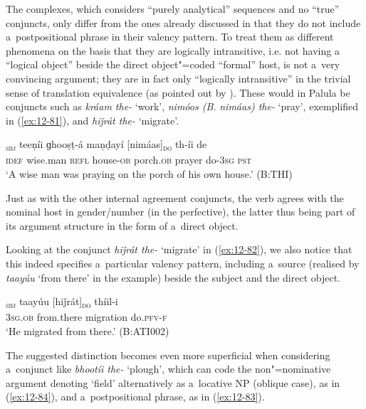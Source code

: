 The complexes, which \citet[201]{verma1993} considers ``purely analytical'' sequences and no ``true'' conjuncts, only differ from the ones already discussed in that they do not include a~postpositional phrase in their valency pattern. To treat them as different phenomena on the basis that they are logically intransitive, i.e. not having a ``logical object'' beside the direct object"=coded ``formal'' host, is not a~very convincing argument; they are in fact only ``logically intransitive'' in the trivial sense of translation equivalence (as pointed out by \citealt[157]{masica1993}). These would in Palula be conjuncts such as \textit{kráam the-} `work', \textit{nimóos (B.} \textit{nimáas) the-} `pray', exemplified in (\ref{ex:12-81}), and \textit{hiǰrát the-} `migrate'. 

\begin{exe}
\ex
\label{ex:12-81}
\gll [ak buzrúɡ]\textsubscript{\textsc{sbj}} teeṇíi ɡhooṣṭ-á maṇḍayí [nimáas]\textsubscript{\textsc{do}} th-íi de \\
\textsc{idef} wise.man \textsc{refl} house-\textsc{ob} porch.\textsc{ob}  prayer do-\textsc{3sg} \textsc{pst} \\
\glt `A wise man was praying on the porch of his own house.' (B:THI)
\end{exe}

Just as with the other internal agreement conjuncts, the verb agrees with the nominal host in gender/number (in the perfective), the latter thus being part of its argument structure in the form of a~direct object. 


Looking at the conjunct \textit{hiǰrát the-} `migrate' in (\ref{ex:12-82}), we also notice that this indeed specifies a~particular valency pattern, including a~source (realised by \textit{taayúu} `from there' in the example) beside the subject and the direct object. 

\begin{exe}
\ex
\label{ex:12-82}
\gll [tíi]\textsubscript{\textsc{sbj}} taayúu [hiǰrát]\textsubscript{\textsc{do}} thíil-i  \\
\textsc{3sg.ob} from.there migration do.\textsc{pfv-f} \\
\glt `He migrated from there.' (B:ATI002)
\end{exe}

The suggested distinction becomes even more superficial when considering a~conjunct like \textit{bhootíi the-} `plough', which can code the non"=nominative argument denoting `field' alternatively as a~locative NP (oblique case), as in (\ref{ex:12-84}), and a~postpositional phrase, as in (\ref{ex:12-83}).

